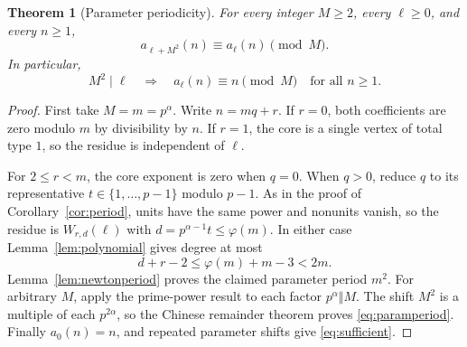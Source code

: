 \documentclass[11pt,letterpaper]{article}
\newtheorem{theorem}{Theorem}[section]
\theoremstyle{definition}
\theoremstyle{remark}
\begin{document}
\begin{theorem}[Parameter periodicity]\label{thm:paramperiod}
For every integer $M\ge2$, every $\ell\ge0$, and every $n\ge1$,
\begin{equation}\label{eq:paramperiod}
 a_{\ell+M^2}(n)\equiv a_\ell(n)\pmod M.
\end{equation}
In particular,
\begin{equation}\label{eq:sufficient}
 M^2\mid\ell\quad\Longrightarrow\quad
 a_\ell(n)\equiv n\pmod M\quad\text{for all }n\ge1.
\end{equation}
\end{theorem}
\begin{proof}
First take $M=m=p^\alpha$. Write $n=mq+r$. If $r=0$, both coefficients
are zero modulo $m$ by divisibility by $n$. If $r=1$, the core is a single
vertex of total type $1$, so the residue is independent of $\ell$.

For $2\le r<m$, the core exponent is zero when $q=0$. When $q>0$, reduce
$q$ to its representative $t\in\{1,\ldots,p-1\}$ modulo $p-1$.
As in the proof of Corollary~\ref{cor:period}, units have the same power
and nonunits vanish, so the residue is
$W_{r,d}(\ell)$ with $d=p^{\alpha-1}t\le\varphi(m)$.
In either case Lemma~\ref{lem:polynomial} gives degree at most
\[
 d+r-2\le\varphi(m)+m-3<2m.
\]
Lemma~\ref{lem:newtonperiod} proves the claimed parameter period $m^2$.
For arbitrary $M$, apply the prime-power result to each factor
$p^\alpha\Vert M$. The shift $M^2$ is a multiple of each $p^{2\alpha}$,
so the Chinese remainder theorem proves \eqref{eq:paramperiod}.
Finally $a_0(n)=n$, and repeated parameter shifts give
\eqref{eq:sufficient}.
\end{proof}
\end{document}
